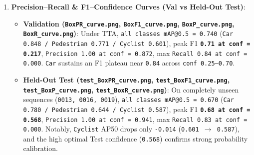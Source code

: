 \documentclass[10.5pt,a4paper]{article}
\begin{document}
\begin{enumerate}[leftmargin=1.8em,itemsep=2pt]
\item \textbf{Precision--Recall \& F1--Confidence Curves (Val vs Held-Out Test)}:
\begin{itemize}[leftmargin=1.5em,itemsep=2pt]
\item \textbf{Validation (\texttt{BoxPR\_\allowbreak{}curve.\allowbreak{}png}, \texttt{BoxF1\_\allowbreak{}curve.\allowbreak{}png}, \texttt{BoxP\_\allowbreak{}curve.\allowbreak{}png}, \texttt{BoxR\_\allowbreak{}curve.\allowbreak{}png})}: Under TTA, \texttt{all classes mAP@0.\allowbreak{}5 = 0.\allowbreak{}740} (\texttt{Car 0.\allowbreak{}848 /\allowbreak{} Pedestrian 0.\allowbreak{}771 /\allowbreak{} Cyclist 0.\allowbreak{}601}), peak F1 \textbf{\texttt{0.\allowbreak{}71 at conf = 0.\allowbreak{}217}}, \texttt{Precision 1.\allowbreak{}00 at conf = 0.\allowbreak{}872}, max \texttt{Recall 0.\allowbreak{}84 at conf = 0.\allowbreak{}000}. \texttt{Car} sustains an F1 plateau near \texttt{0.\allowbreak{}84} across \texttt{conf 0.\allowbreak{}25--0.\allowbreak{}70}.
\item \textbf{Held-Out Test (\texttt{test\_\allowbreak{}BoxPR\_\allowbreak{}curve.\allowbreak{}png}, \texttt{test\_\allowbreak{}BoxF1\_\allowbreak{}curve.\allowbreak{}png}, \texttt{test\_\allowbreak{}BoxP\_\allowbreak{}curve.\allowbreak{}png}, \texttt{test\_\allowbreak{}BoxR\_\allowbreak{}curve.\allowbreak{}png})}: On completely unseen sequences (\texttt{0013,\allowbreak{} 0016,\allowbreak{} 0019}), \texttt{all classes mAP@0.\allowbreak{}5 = 0.\allowbreak{}670} (\texttt{Car 0.\allowbreak{}780 /\allowbreak{} Pedestrian 0.\allowbreak{}644 /\allowbreak{} Cyclist 0.\allowbreak{}587}), peak F1 \textbf{\texttt{0.\allowbreak{}68 at conf = 0.\allowbreak{}568}}, \texttt{Precision 1.\allowbreak{}00 at conf = 0.\allowbreak{}941}, max \texttt{Recall 0.\allowbreak{}83 at conf = 0.\allowbreak{}000}. Notably, \texttt{Cyclist} AP50 drops only \texttt{-\allowbreak{}0.\allowbreak{}014} (\texttt{0.\allowbreak{}601 $\rightarrow$ 0.\allowbreak{}587}), and the high optimal Test confidence (\texttt{0.\allowbreak{}568}) confirms strong probability calibration.
\end{itemize}
\end{enumerate}
\end{document}
